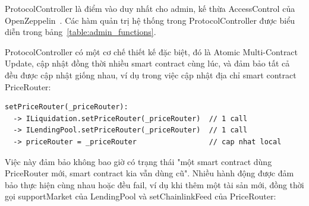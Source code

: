 \documentclass[../DoAn.tex]{subfiles}
\begin{document}
ProtocolController là điểm vào duy nhất cho admin, kế thừa AccessControl của OpenZeppelin~\cite{OpenZeppelinDocs}. Các hàm quản trị hệ thống trong ProtocolController được biểu diễn trong bảng~\ref{table:admin_functions}.

\begin{table}[H]
\centering
{}
\caption{Các hàm quản trị admin}
\label{table:admin_functions}
\end{table}


ProtocolController có một cơ chế thiết kế đặc biệt, đó là Atomic Multi-Contract Update, cập nhật đồng thời nhiều smart contract cùng lúc, và đảm bảo tất cả đều được cập nhật giống nhau, ví dụ trong việc cập nhật địa chỉ smart contract PriceRouter:
\begin{lstlisting}
setPriceRouter(_priceRouter):
  -> ILiquidation.setPriceRouter(_priceRouter)  // 1 call
  -> ILendingPool.setPriceRouter(_priceRouter)  // 1 call
  -> priceRouter = _priceRouter                 // cap nhat local
\end{lstlisting}

Việc này đảm bảo không bao giờ có trạng thái "một smart contract dùng PriceRouter mới, smart contract kia vẫn dùng cũ". Nhiều hành động được đảm bảo thực hiện cùng nhau hoặc đều fail, ví dụ khi thêm một tài sản mới, đồng thời gọi supportMarket của LendingPool và setChainlinkFeed của PriceRouter:
\end{document}
